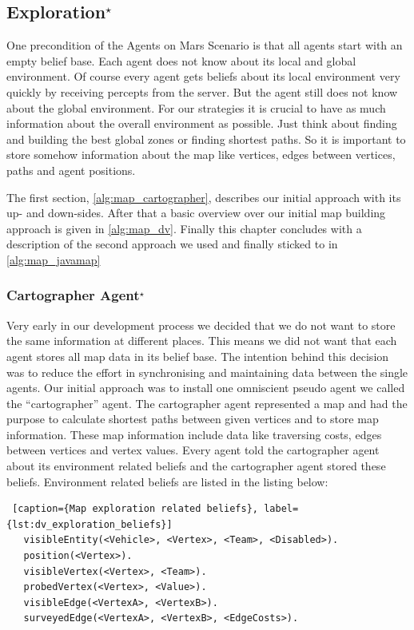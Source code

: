 \subsection[Exploration]{Exploration$^\star$}\label{alg:exploration}
One precondition of the Agents on Mars Scenario is that all agents start with an empty belief base. Each agent does not know about its local and global environment. Of course every agent gets beliefs about its local environment very quickly by receiving percepts from the server. But the agent still does not know about the global environment. For our strategies it is crucial to have as much information about the overall environment as possible. Just think about finding and building the best global zones or finding shortest paths. So it is important to store somehow information about the map like vertices, edges between vertices, paths and agent positions.

The first section, \autoref{alg:map_cartographer}, describes our initial approach with its up- and down-sides. After that a basic overview over our initial map building approach is given in \autoref{alg:map_dv}. Finally this chapter concludes with a description of the second approach we used and finally sticked to in \autoref{alg:map_javamap}


\subsubsection[Cartographer Agent]{Cartographer Agent$^\star$}\label{alg:map_cartographer}
Very early in our development process we decided that we do not want to store the same information at different places. This means we did not want that each agent stores all map data in its belief base. The intention behind this decision was to reduce the effort in synchronising and maintaining data between the single agents. Our initial approach was to install one omniscient pseudo agent we called the ``cartographer'' agent. The cartographer agent represented a map and had the purpose to calculate shortest paths between given vertices and to store map information. These map information include data like traversing costs, edges between vertices and vertex values. Every agent told the cartographer agent about its environment related beliefs and the cartographer agent stored these beliefs. Environment related beliefs are listed in the listing below:

\begin{lstlisting} [caption={Map exploration related beliefs}, label={lst:dv_exploration_beliefs}]
   visibleEntity(<Vehicle>, <Vertex>, <Team>, <Disabled>).
   position(<Vertex>).
   visibleVertex(<Vertex>, <Team>).
   probedVertex(<Vertex>, <Value>).
   visibleEdge(<VertexA>, <VertexB>).
   surveyedEdge(<VertexA>, <VertexB>, <EdgeCosts>).
\end{lstlisting}

